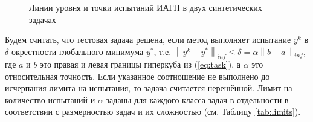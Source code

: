 \begin{figure}[ht]
    \centering
    \caption{Линии уровня и точки испытаний ИАГП в двух синтетических задачах}
    \label{fig:isolines}
\end{figure}


Будем считать, что тестовая задача решена, если метод выполняет испытание
\(y^k\) в \(\delta\)-окрестности глобального минимума \(y^*\), т.е. $\left\|y^k-y^*\right\|_{inf}\leq \delta
= \alpha\left\|b-a\right\|_{inf}$, где \(a\) и \(b\) это правая и левая границы гиперкуба из (\ref{eq:task}),
а $\alpha$ это относительная точность. Если указанное соотношение не выполнено до исчерпания лимита на
испытания, то задача считается нерешённой. Лимит на количество испытаний и $\alpha$ заданы для каждого класса задач в отдельности
в соответствии с размерностью задач и их сложностью (см. Таблицу \ref{tab:limits}).

